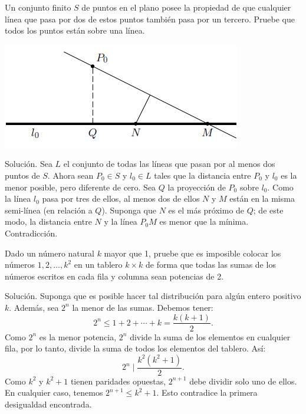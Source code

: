 \documentclass[11pt]{scrartcl}
\begin{document}
\begin{example}
    Un conjunto finito \(S\) de puntos en el plano posee la propiedad de que cualquier línea que pasa por dos de estos puntos también pasa por un tercero. Pruebe que todos los puntos están sobre una línea.
\end{example}

\begin{center}
    \includegraphics[scale=1]{images/clase_13_silvestre.png}
\end{center}

Solución. Sea \(L\) el conjunto de todas las líneas que pasan por al menos dos puntos de \(S\). Ahora sean \(P_0 \in S\) y \(l_0 \in L\) tales que la distancia entre \(P_0\) y \(l_0\) es la menor posible, pero diferente de cero. Sea \(Q\) la proyección de \(P_0\) sobre \(l_0\). Como la línea \(l_0\) pasa por tres de ellos, al menos dos de ellos \(N\) y \(M\) están en la misma semi-línea (en relación a \(Q\)). Suponga que \(N\) es el más próximo de \(Q\); de este modo, la distancia entre \(N\) y la línea \(P_0M\) es menor que la mínima. Contradicción.\\

\begin{example}[Leningrado 1989]
    Dado un número natural \(k\) mayor que 1, pruebe que es imposible colocar los números \(1, 2, \ldots, k^2\) en un tablero \(k \times k\) de forma que todas las sumas de los números escritos en cada fila y columna sean potencias de 2.
\end{example}
Solución. Suponga que es posible hacer tal distribución para algún entero positivo \(k\). Además, sea \(2^n\) la menor de las sumas. Debemos tener:
\[
2^n \leq 1 + 2 + \cdots + k = \frac{k(k+1)}{2}.
\]
Como \(2^n\) es la menor potencia, \(2^n\) divide la suma de los elementos en cualquier fila, por lo tanto, divide la suma de todos los elementos del tablero. Así:
\[
2^n \mid \frac{k^2(k^2 + 1)}{2}.
\]
Como \(k^2\) y \(k^2 + 1\) tienen paridades opuestas, \(2^{n+1}\) debe dividir solo uno de ellos. En cualquier caso, tenemos \(2^{n+1} \leq k^2 + 1\). Esto contradice la primera desigualdad encontrada.
\end{document}
